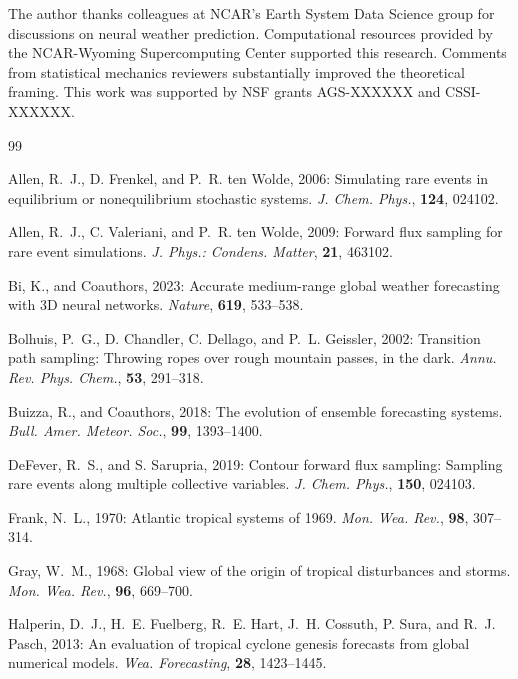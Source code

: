 \documentclass[11pt]{article}
\begin{document}
The author thanks colleagues at NCAR's Earth System Data Science group for discussions on neural weather prediction. Computational resources provided by the NCAR-Wyoming Supercomputing Center supported this research. Comments from statistical mechanics reviewers substantially improved the theoretical framing. This work was supported by NSF grants AGS-XXXXXX and CSSI-XXXXXX.

\begin{thebibliography}{99}

Allen, R.~J., D. Frenkel, and P.~R. ten Wolde, 2006: Simulating rare events in equilibrium or nonequilibrium stochastic systems. \textit{J. Chem. Phys.}, \textbf{124}, 024102.

Allen, R.~J., C. Valeriani, and P.~R. ten Wolde, 2009: Forward flux sampling for rare event simulations. \textit{J. Phys.: Condens. Matter}, \textbf{21}, 463102.

Bi, K., and Coauthors, 2023: Accurate medium-range global weather forecasting with 3D neural networks. \textit{Nature}, \textbf{619}, 533--538.

Bolhuis, P.~G., D. Chandler, C. Dellago, and P.~L. Geissler, 2002: Transition path sampling: Throwing ropes over rough mountain passes, in the dark. \textit{Annu. Rev. Phys. Chem.}, \textbf{53}, 291--318.

Buizza, R., and Coauthors, 2018: The evolution of ensemble forecasting systems. \textit{Bull. Amer. Meteor. Soc.}, \textbf{99}, 1393--1400.

DeFever, R.~S., and S. Sarupria, 2019: Contour forward flux sampling: Sampling rare events along multiple collective variables. \textit{J. Chem. Phys.}, \textbf{150}, 024103.

Frank, N.~L., 1970: Atlantic tropical systems of 1969. \textit{Mon. Wea. Rev.}, \textbf{98}, 307--314.

Gray, W.~M., 1968: Global view of the origin of tropical disturbances and storms. \textit{Mon. Wea. Rev.}, \textbf{96}, 669--700.

Halperin, D.~J., H.~E. Fuelberg, R.~E. Hart, J.~H. Cossuth, P. Sura, and R.~J. Pasch, 2013: An evaluation of tropical cyclone genesis forecasts from global numerical models. \textit{Wea. Forecasting}, \textbf{28}, 1423--1445.


\end{thebibliography}
\end{document}
